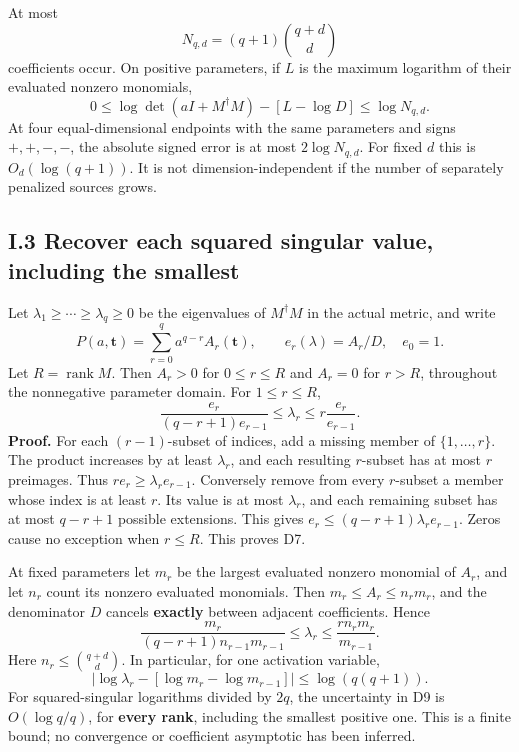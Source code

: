 \documentclass[11pt]{article}
\begin{document}
At most \[
 N_{q,d}=(q+1)\binom{q+d}{d}
\] coefficients occur. On positive parameters, if \(L\) is the maximum logarithm of their evaluated nonzero monomials, \[
 0\le\log\det(aI+M^\dagger M)-[L-\log D]\le\log N_{q,d}.
 \tag{D6}
\] At four equal-dimensional endpoints with the same parameters and signs \(+,+,-,-\), the absolute signed error is at most \(2\log N_{q,d}\). For fixed \(d\) this is \(O_d(\log(q+1))\). It is not dimension-independent if the number of separately penalized sources grows.

\subsection{I.3 Recover each squared singular value, including the smallest}\label{i.3-recover-each-squared-singular-value-including-the-smallest}

Let \(\lambda_1\ge\cdots\ge\lambda_q\ge0\) be the eigenvalues of \(M^\dagger M\) in the actual metric, and write \[
 P(a,\boldsymbol t)=\sum_{r=0}^q a^{q-r}A_r(\boldsymbol t),\qquad
 e_r(\lambda)=A_r/D,\quad e_0=1.
\] Let \(R=\operatorname{rank}M\). Then \(A_r>0\) for \(0\le r\le R\) and \(A_r=0\) for \(r>R\), throughout the nonnegative parameter domain. For \(1\le r\le R\), \[
 \boxed{\frac{e_r}{(q-r+1)e_{r-1}}
 \le\lambda_r\le r\frac{e_r}{e_{r-1}}.}
 \tag{D7}
\] \textbf{Proof.} For each \((r-1)\)-subset of indices, add a missing member of \(\{1,\ldots,r\}\). The product increases by at least \(\lambda_r\), and each resulting \(r\)-subset has at most \(r\) preimages. Thus \(re_r\ge\lambda_re_{r-1}\). Conversely remove from every \(r\)-subset a member whose index is at least \(r\). Its value is at most \(\lambda_r\), and each remaining subset has at most \(q-r+1\) possible extensions. This gives \(e_r\le(q-r+1)\lambda_re_{r-1}\). Zeros cause no exception when \(r\le R\). This proves D7.

At fixed parameters let \(m_r\) be the largest evaluated nonzero monomial of \(A_r\), and let \(n_r\) count its nonzero evaluated monomials. Then \(m_r\le A_r\le n_rm_r\), and the denominator \(D\) cancels \textbf{exactly} between adjacent coefficients. Hence \[
 \boxed{\frac{m_r}{(q-r+1)n_{r-1}m_{r-1}}
 \le\lambda_r\le
 \frac{r n_rm_r}{m_{r-1}}.}
 \tag{D8}
\] Here \(n_r\le\binom{q+d}{d}\). In particular, for one activation variable, \[
 \left|\log\lambda_r-[\log m_r-\log m_{r-1}]\right|
 \le\log(q(q+1)).
 \tag{D9}
\] For squared-singular logarithms divided by \(2q\), the uncertainty in D9 is \(O(\log q/q)\), for \textbf{every rank}, including the smallest positive one. This is a finite bound; no convergence or coefficient asymptotic has been inferred.
\end{document}
